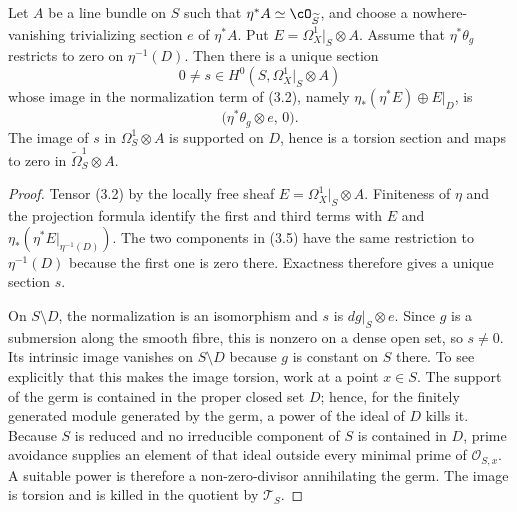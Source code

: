 \begin{proposition}
\label{prop:conductor-differential}
Let $A$ be a line bundle on $S$ such that $\eta^*A\simeq\cO_{\widetilde S}$,
and choose a nowhere-vanishing trivializing section $e$ of $\eta^*A$.
Put $E=\Omega^1_X|_S\otimes A$.  Assume that $\eta^*\theta_g$ restricts to
zero on $\eta^{-1}(D)$.  Then there is a unique section
\[
 0\ne s\in H^0(S,\Omega^1_X|_S\otimes A)
 \tag{3.4}
\]
whose image in the normalization term of (3.2), namely
$\eta_*(\eta^*E)\oplus E|_D$, is
\[
  \bigl(\eta^*\theta_g\otimes e,\,0\bigr).
 \tag{3.5}
\]
The image of $s$ in $\Omega^1_S\otimes A$ is supported on $D$, hence is a
torsion section and maps to zero in $\widetilde\Omega^1_S\otimes A$.
\end{proposition}

\begin{proof}
Tensor (3.2) by the locally free sheaf
$E=\Omega^1_X|_S\otimes A$.  Finiteness of $\eta$ and the projection formula
identify the first and third terms with $E$ and
$\eta_*(\eta^*E|_{\eta^{-1}(D)})$.  The two components in (3.5) have the
same restriction to $\eta^{-1}(D)$ because the first one is zero there.
Exactness therefore gives a unique section $s$.

On $S\setminus D$, the normalization is an isomorphism and $s$ is
$dg|_S\otimes e$.  Since $g$ is a submersion along the smooth fibre, this is
nonzero on a dense open set, so $s\ne0$.  Its intrinsic image vanishes on
$S\setminus D$ because $g$ is constant on $S$ there.  To see explicitly that
this makes the image torsion, work at a point $x\in S$.  The support of the
germ is contained in the proper closed set $D$; hence, for the finitely
generated module generated by the germ, a power of the ideal of $D$ kills it.
Because $S$ is reduced and no irreducible component of $S$ is contained in
$D$, prime avoidance supplies an element of that ideal outside every minimal
prime of $\mathcal O_{S,x}$.  A suitable power is therefore a non-zero-divisor
annihilating the germ.  The image is torsion and is killed in the quotient by
$\mathscr T_S$.
\end{proof}

